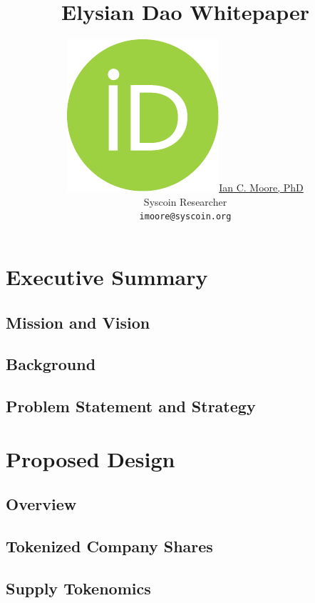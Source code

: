 \documentclass{article}
\title{Elysian Dao Whitepaper}
\author{ 
\href{https://orcid.org/0000-0000-0000-0000}{\includegraphics[scale=0.06]{orcid.pdf}\hspace{1mm}Ian C. Moore, PhD}\\
	Syscoin Researcher\\
	\texttt{imoore@syscoin.org} \\
}
\begin{document}
\maketitle

\begin{abstract}

\lipsum[1-1]

\end{abstract}


\section{Executive Summary}

\subsection{Mission and Vision}

\lipsum[1-1]

\subsection{Background}

\lipsum[1-1]

\subsection{Problem Statement and Strategy}

\lipsum[1-1]
 


\section{Proposed Design}

\subsection{Overview}

\lipsum[1-1]

\subsection{Tokenized Company Shares}

\lipsum[1-1]

\subsection{Supply Tokenomics}
\label{section:token_model}
\end{document}
